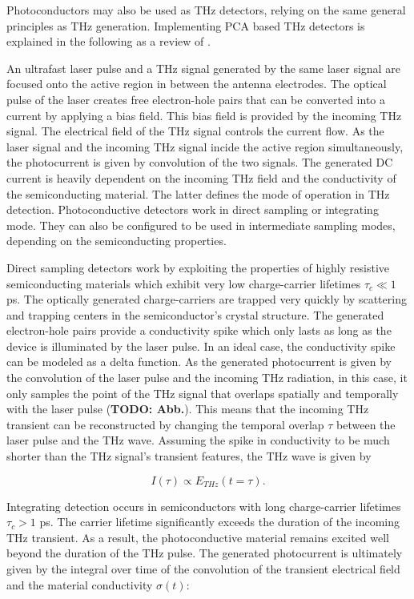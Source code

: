 Photoconductors may also be used as THz detectors, relying on the same general principles as THz generation. Implementing PCA based THz detectors is explained in the following as a review of \cite{preuPrinciplesTHzGeneration2015,castro-camusPhotoconductiveResponseCorrection2008}. 

An ultrafast laser pulse and a THz signal generated by the same laser signal are focused onto the active region in between the antenna electrodes. The optical pulse of the laser creates free electron-hole pairs that can be converted into a current by applying a bias field. This bias field is provided by the incoming THz signal. The electrical field of the THz signal controls the current flow. As the laser signal and the incoming THz signal incide the active region simultaneously, the photocurrent is given by convolution of the two signals. The generated DC current is heavily dependent on the incoming THz field and the conductivity of the semiconducting material. The latter defines the mode of operation in THz detection. Photoconductive detectors work in direct sampling or integrating mode. They can also be configured to be used in intermediate sampling modes, depending on the semiconducting properties.

Direct sampling detectors work by exploiting the properties of highly resistive semiconducting materials which exhibit very low charge-carrier lifetimes $\tau_c \ll 1$ \si{\pico \s}. The optically generated charge-carriers are trapped very quickly by scattering and trapping centers in the semiconductor's crystal structure. The generated electron-hole pairs provide a conductivity spike which only lasts as long as the device is illuminated by the laser pulse. In an ideal case, the conductivity spike can be modeled as a delta function. As the generated photocurrent is given by the convolution of the laser pulse and the incoming THz radiation, in this case, it only samples the point of the THz signal that overlaps spatially and temporally with the laser pulse (\textbf{TODO: Abb.}). This means that the incoming THz transient can be reconstructed by changing the temporal overlap $\tau$ between the laser pulse and the THz wave. Assuming the spike in conductivity to be much shorter than the THz signal's transient features, the THz wave is given by

\begin{equation}
	I(\tau) \propto E_{THz}(t=\tau).
\end{equation}

Integrating detection occurs in semiconductors with long charge-carrier lifetimes $\tau_c > 1$ \si{\pico \s}. The carrier lifetime significantly exceeds the duration of the incoming THz transient. As a result, the photoconductive material remains excited well beyond the duration of the THz pulse. The generated photocurrent is ultimately given by the integral over time of the convolution of the transient electrical field and the material conductivity $\sigma(t)$:

